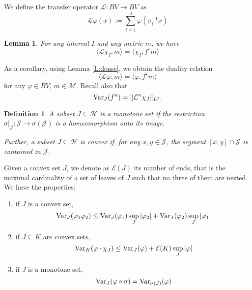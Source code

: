 \documentclass[11pt]{amsart}
\newtheorem{lemma}[theorem]{Lemma}
\newtheorem{definition}[theorem]{Definition}
\newcommand{\var}{\textup{Var}}
\begin{document}
We define the transfer operator $\mathcal{L} : BV \to BV$ as 
$$\mathcal{L}\varphi (x) := \sum_{i = 1}^d \varphi(\sigma_i^{-1} x)$$



\begin{lemma}
For any interval $I$ and any metric $m$, we have 
$$\langle \mathcal{L} \chi_I, m \rangle = \langle \chi_I, f^\star m \rangle$$
\end{lemma}


As a corollary, using Lemma \ref{L:dense}, 
we obtain the duality relation %
$$\langle \mathcal{L} \varphi, m \rangle = \langle \varphi, f^\star m \rangle$$
for any $\varphi \in BV$, $m \in \mathcal{M}$. 
Recall also that 
$$\textup{Var}_J (f^n) = \Vert \mathcal{L}^n \chi_J \Vert_{L^1}.$$



\begin{definition}
A subset $J \subseteq \mathcal{H}$ is a \emph{monotone set} if the restriction $\sigma\vert_{\mathcal{J}} : \mathcal{J} \to \sigma(\mathcal{J})$ 
is a homeomorphism onto its image. 

Further, a subset $J \subseteq \mathcal{H}$ is \emph{convex} if, for any $x, y \in \mathcal{J}$, the segment $[x, y] \cap \mathcal{J}$ is contained in $\mathcal{J}$. 
\end{definition}

Given a convex set $J$, we denote as $\mathcal{E}(J)$ its number of ends, that is the maximal 
cardinality of a set of leaves of $J$ such that no three of them are nested. 
We have the properties: 
\begin{enumerate}
\item if $J$ is a convex set, 
$$\var_J(\varphi_1 \varphi_2) \leq \var_J(\varphi_1) \sup_J |\varphi_2| + \var_J(\varphi_2) \sup_J |\varphi_1|$$
\item if $J \subseteq K$ are convex sets, 
$$\var_K (\varphi \cdot \chi_J) \leq \var_J (\varphi) + \mathcal{E}(K) \sup_J |\varphi|$$
\item if $J$ is a monotone set,
$$\textup{Var}_J (\varphi \circ \sigma) = \textup{Var}_{\sigma(J)}(\varphi)$$
\end{enumerate}
\end{document}
